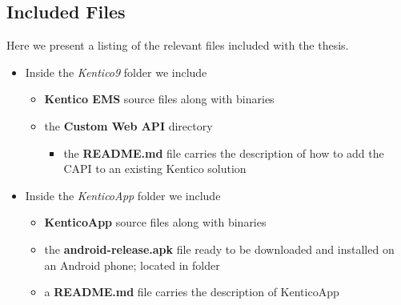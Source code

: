 \begin{appendices}
\chapter{Included Files}
Here we present a listing of the relevant files included with the thesis.
\begin{itemize}
   \item Inside the \textit{Kentico9} folder we include
   \begin{itemize}     
	 \item  \textbf{Kentico EMS} source files along with binaries
	 \item  the \textbf{Custom Web API} directory
	  \begin{itemize}     
		\item the \textbf{README.md} file carries the description of how to add the CAPI to an existing Kentico solution
	  \end{itemize}
   \end{itemize}
   \item  Inside the \textit{KenticoApp} folder we include
	\begin{itemize}
	 \item \textbf{KenticoApp} source files along with binaries
     \item the \textbf{android-release.apk} file ready to be downloaded and installed on an Android phone; located in folder \textit{}
	 \item a \textbf{README.md} file carries the description of KenticoApp
	\end{itemize}
 \end{itemize}
\end{appendices}